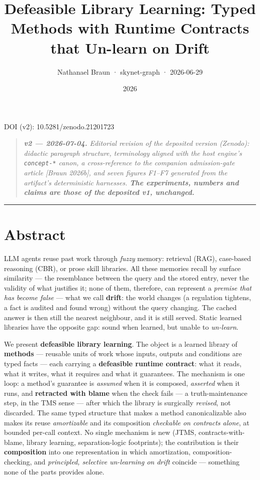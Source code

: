 \documentclass[11pt]{article}
\title{\textbf{Defeasible Library Learning: Typed Methods with Runtime Contracts that Un-learn on Drift}}
\author{Nathanael Braun · skynet-graph · 2026-06-29}
\date{2026}
\begin{document}
\maketitle
DOI (v2): 10.5281/zenodo.21201723

\begin{quote}\itshape \textbf{v2 — 2026-07-04.} Editorial revision of the deposited version (Zenodo): didactic paragraph structure, terminology aligned with the host engine's \texttt{concept-*} canon, a cross-reference to the companion admission-gate article [Braun 2026b], and seven figures F1–F7 generated from the artifact's deterministic harnesses. \textbf{The experiments, numbers and claims are those of the deposited v1, unchanged.}\end{quote}

\medskip\hrule\medskip

\section*{Abstract}

LLM agents reuse past work through \emph{fuzzy} memory: retrieval (RAG), case-based reasoning (CBR), or prose skill libraries. All these memories recall by surface similarity — the resemblance between the query and the stored entry, never the validity of what justifies it; none of them, therefore, can represent a \emph{premise that has become false} — what we call \textbf{drift}: the world changes (a regulation tightens, a fact is audited and found wrong) without the query changing. The cached answer is then still the nearest neighbour, and it is still served. Static learned libraries have the opposite gap: sound when learned, but unable to \emph{un-learn}.

We present \textbf{defeasible library learning}. The object is a learned library of \textbf{methods} — reusable units of work whose inputs, outputs and conditions are typed facts — each carrying a \textbf{defeasible runtime contract}: what it reads, what it writes, what it requires and what it guarantees. The mechanism is one loop: a method's guarantee is \emph{assumed} when it is composed, \emph{asserted} when it runs, and \textbf{retracted with blame} when the check fails — a truth-maintenance step, in the TMS sense — after which the library is surgically \emph{revised}, not discarded. The same typed structure that makes a method canonicalizable also makes its reuse \emph{amortizable} and its composition \emph{checkable on contracts alone}, at bounded per-call context. No single mechanism is new (JTMS, contracts-with-blame, library learning, separation-logic footprints); the contribution is their \textbf{composition} into one representation in which amortization, composition-checking, and \emph{principled, selective un-learning on drift} coincide — something none of the parts provides alone.
\end{document}
